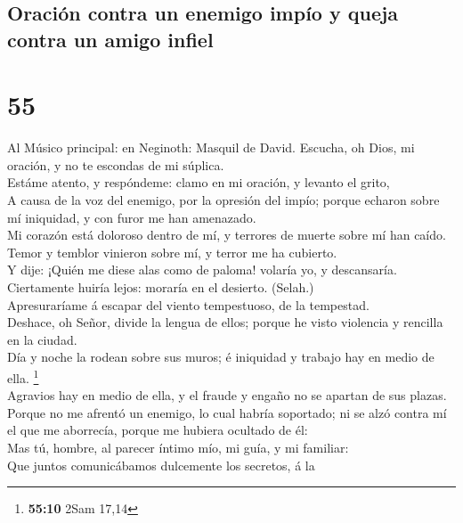\hypertarget{oraciuxf3n-contra-un-enemigo-impuxedo-y-queja-contra-un-amigo-infiel}{%
\subsection{Oración contra un enemigo impío y queja contra un amigo
infiel}\label{oraciuxf3n-contra-un-enemigo-impuxedo-y-queja-contra-un-amigo-infiel}}

\hypertarget{section-54}{%
\section{55}\label{section-54}}

 Al Músico principal: en Neginoth: Masquil de David.
Escucha, oh Dios, mi oración, y no te escondas de mi súplica.\\
 Estáme atento, y respóndeme: clamo en mi oración, y levanto
el grito,\\
 A causa de la voz del enemigo, por la opresión del impío;
porque echaron sobre mí iniquidad, y con furor me han amenazado.\\
 Mi corazón está doloroso dentro de mí, y terrores de muerte
sobre mí han caído.\\
 Temor y temblor vinieron sobre mí, y terror me ha
cubierto.\\
 Y dije: ¡Quién me diese alas como de paloma! volaría yo, y
descansaría.\\
 Ciertamente huiría lejos: moraría en el desierto.
(Selah.)\\
 Apresuraríame á escapar del viento tempestuoso, de la
tempestad.\\
 Deshace, oh Señor, divide la lengua de ellos; porque he
visto violencia y rencilla en la ciudad.\\
 Día y noche la rodean sobre sus muros; é iniquidad y
trabajo hay en medio de ella. \footnote{\textbf{55:10} 2Sam 17,14}\\
 Agravios hay en medio de ella, y el fraude y engaño no se
apartan de sus plazas.\\
 Porque no me afrentó un enemigo, lo cual habría soportado;
ni se alzó contra mí el que me aborrecía, porque me hubiera ocultado de
él:\\
 Mas tú, hombre, al parecer íntimo mío, mi guía, y mi
familiar:\\
 Que juntos comunicábamos dulcemente los secretos, á la
